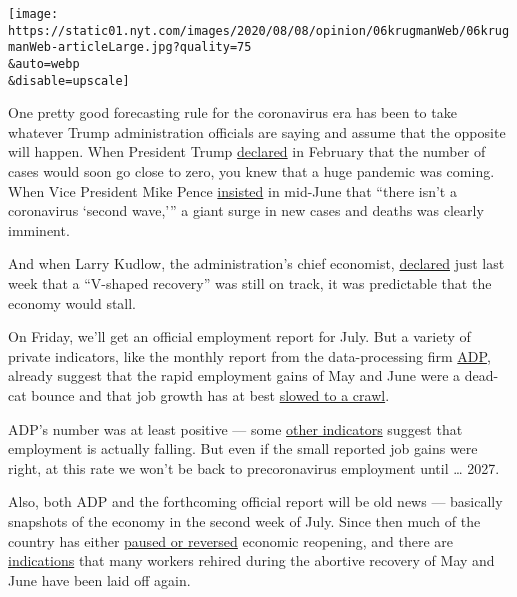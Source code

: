 \texttt{[image: https://static01.nyt.com/images/2020/08/08/opinion/06krugmanWeb/06krugmanWeb-articleLarge.jpg?quality=75\\\&auto=webp\\\&disable=upscale]}

One pretty good forecasting rule for the coronavirus era has been to
take whatever Trump administration officials are saying and assume that
the opposite will happen. When President Trump
\href{https://www.cbsnews.com/news/timeline-president-donald-trump-changing-statements-on-coronavirus/}{declared}
in February that the number of cases would soon go close to zero, you
knew that a huge pandemic was coming. When Vice President Mike Pence
\href{https://www.wsj.com/articles/there-isnt-a-coronavirus-second-wave-11592327890}{insisted}
in mid-June that ``there isn't a coronavirus `second wave,''' a giant
surge in new cases and deaths was clearly imminent.

And when Larry Kudlow, the administration's chief economist,
\href{https://www.foxbusiness.com/economy/kudlow-maintains-v-shaped-economic-recovery-still-intact-despite-coronavirus-resurgence}{declared}
just last week that a ``V-shaped recovery'' was still on track, it was
predictable that the economy would stall.

On Friday, we'll get an official employment report for July. But a
variety of private indicators, like the monthly report from the
data-processing firm \href{https://adpemploymentreport.com/}{ADP},
already suggest that the rapid employment gains of May and June were a
dead-cat bounce and that job growth has at best
\href{https://fred.stlouisfed.org/series/NPPTTL}{slowed to a crawl}.

ADP's number was at least positive --- some
\href{https://twitter.com/ernietedeschi/status/1290971597508169729}{other
indicators} suggest that employment is actually falling. But even if the
small reported job gains were right, at this rate we won't be back to
precoronavirus employment until \ldots{} 2027.

Also, both ADP and the forthcoming official report will be old news ---
basically snapshots of the economy in the second week of July. Since
then much of the country has either
\href{https://www.nytimes.com/interactive/2020/us/states-reopen-map-coronavirus.html}{paused
or reversed} economic reopening, and there are
\href{https://d3n8a8pro7vhmx.cloudfront.net/prosperousamerica/pages/5561/attachments/original/1596512047/Cornell-JQI-RIWI_Poll_Report_-_Second_Wave_of_Layoffs_Well_Under_Way_-_080420_FINAL.pdf?1596512047}{indications}
that many workers rehired during the abortive recovery of May and June
have been laid off again.

